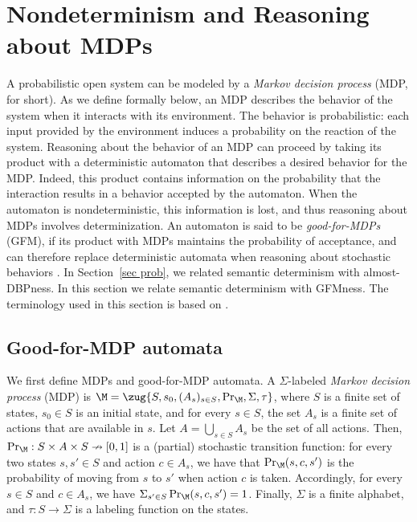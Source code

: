 \documentclass{lmcs}
\begin{document}
\section{Nondeterminism and Reasoning about MDPs}

A probabilistic open system can be modeled by a \emph{Markov decision process} (MDP, for short). As we define formally below, an MDP describes the behavior of the system when it interacts with its environment. The behavior is probabilistic: each input provided by the environment induces a probability on the reaction of the system. Reasoning about the behavior of an MDP can proceed by taking its product with a deterministic automaton that describes a desired behavior for the MDP. 
Indeed, this product contains information on the probability that the interaction results in a behavior accepted by the automaton. When the automaton is nondeterministic, this information is lost, and thus reasoning about MDPs involves determinization. An automaton is said to be {\em good-for-MDPs} (GFM), if its product with MDPs maintains the probability of acceptance, and can therefore replace deterministic automata when reasoning about stochastic behaviors \cite{HPSSTWW20,STZ22}. In Section~\ref{sec prob}, we related semantic determinism with almost-DBPness. 
In this section we relate semantic determinism with GFMness. 
The terminology used in this section is based on \cite{HPSSTWW20}.

\subsection{Good-for-MDP automata}

We first define MDPs and good-for-MDP automata. 
A $\Sigma$-labeled \emph{Markov decision process} (MDP) is $\M =\zug{S,s_0,(A_s)_{s\in S},\Pr_{\M},\Sigma,\tau}$, where $S$ is a finite set of states, $s_0\in S$ is an initial state, and for every $s\in S$, the set $A_s$ is a finite set of actions that are available in $s$. Let $A=\bigcup_{s\in S}A_s$ be the set of all actions. Then, $\Pr_\M:S\times A\times S\nrightarrow [0,1]$ is a (partial) stochastic transition function: for every two states $s,s'\in S$ and action $c\in A_s$, we have that $\Pr_\M(s,c,s')$ is the probability of moving from $s$ to $s'$ when action $c$ is taken. Accordingly, for every $s\in S$ and $c\in A_s$, we have $\Sigma_{s'\in S}\Pr_\M(s,c,s') = 1$. Finally, $\Sigma$ is a finite alphabet, and $\tau:S\rightarrow \Sigma$ is a labeling function on the states. 
\end{document}
